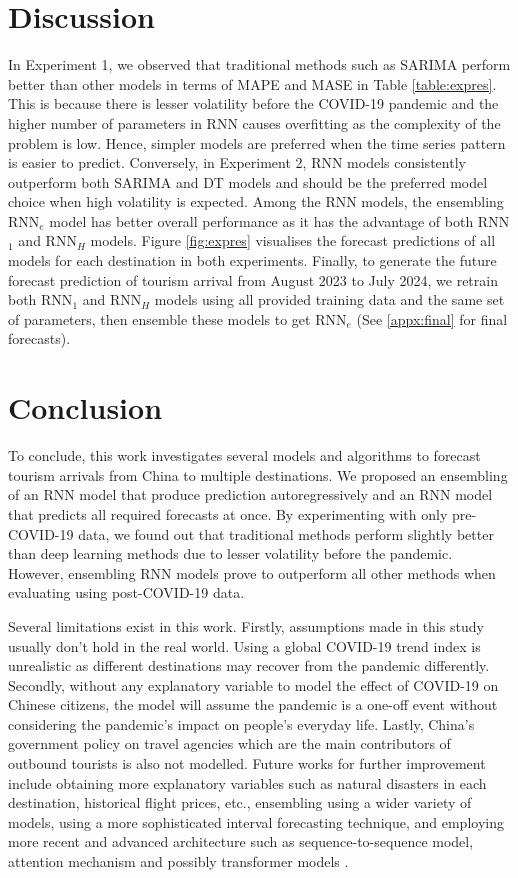 \documentclass{article}
\begin{document}
\section{Discussion}
In Experiment 1, we observed that traditional methods such as SARIMA perform better than other models in terms of MAPE and MASE in Table \ref{table:expres}. This is because there is lesser volatility before the COVID-19 pandemic and the higher number of parameters in RNN causes overfitting as the complexity of the problem is low. Hence, simpler models are preferred when the time series pattern is easier to predict. Conversely, in Experiment 2, RNN models consistently outperform both SARIMA and DT models and should be the preferred model choice when high volatility is expected. Among the RNN models, the ensembling RNN$_e$ model has better overall performance as it has the advantage of both RNN$_1$ and RNN$_H$ models. Figure \ref{fig:expres} visualises the forecast predictions of all models for each destination in both experiments. Finally, to generate the future forecast prediction of tourism arrival from August 2023 to July 2024, we retrain both RNN$_1$ and RNN$_H$ models using all provided training data and the same set of parameters, then ensemble these models to get RNN$_e$ (See \ref{appx:final} for final forecasts).

\section{Conclusion}
To conclude, this work investigates several models and algorithms to forecast tourism arrivals from China to multiple destinations. We proposed an ensembling of an RNN model that produce prediction autoregressively and an RNN model that predicts all required forecasts at once. By experimenting with only pre-COVID-19 data, we found out that traditional methods perform slightly better than deep learning methods due to lesser volatility before the pandemic. However, ensembling RNN models prove to outperform all other methods when evaluating using post-COVID-19 data. 

Several limitations exist in this work. Firstly, assumptions made in this study usually don't hold in the real world. Using a global COVID-19 trend index is unrealistic as different destinations may recover from the pandemic differently. Secondly, without any explanatory variable to model the effect of COVID-19 on Chinese citizens, the model will assume the pandemic is a one-off event without considering the pandemic's impact on people's everyday life. Lastly, China's government policy on travel agencies which are the main contributors of outbound tourists is also not modelled. Future works for further improvement include obtaining more explanatory variables such as natural disasters in each destination, historical flight prices, etc., ensembling using a wider variety of models, using a more sophisticated interval forecasting technique, and employing more recent and advanced architecture such as sequence-to-sequence model, attention mechanism \cite{attention} and possibly transformer models \cite{transformer}.
\end{document}
